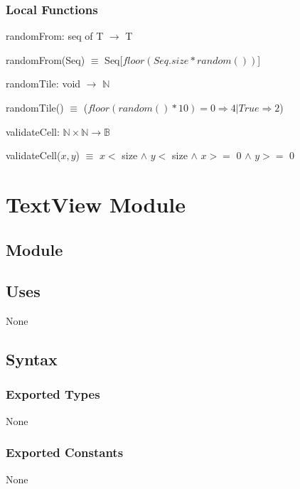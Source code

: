\documentclass[12pt]{article}
\begin{document}
\subsubsection* {Local Functions}

randomFrom: seq of T $\rightarrow$ T

\medskip

\noindent randomFrom(Seq) $\equiv$ Seq[$floor(Seq.size*random())$]

\medskip
\noindent randomTile: void $\rightarrow$ $\mathbb{N}$

\medskip
\noindent randomTile() $\equiv$ ($floor(random()*10)=0 \Rightarrow 4 | True \Rightarrow 2$)

\medskip
\noindent validateCell: $\mathbb{N} \times \mathbb{N} \rightarrow \mathbb{B}$ 

\medskip

\noindent validateCell($x, y$) $\equiv$ $x <$ size $\wedge$ $y <$ size $\wedge$ $x >=$ 0 $\wedge$ $y >=$ 0 

\newpage

\section* {TextView Module}

\subsection* {Module}

\subsection* {Uses}

None

\subsection* {Syntax}

\subsubsection* {Exported Types}

None

\subsubsection* {Exported Constants}

None
\end{document}
